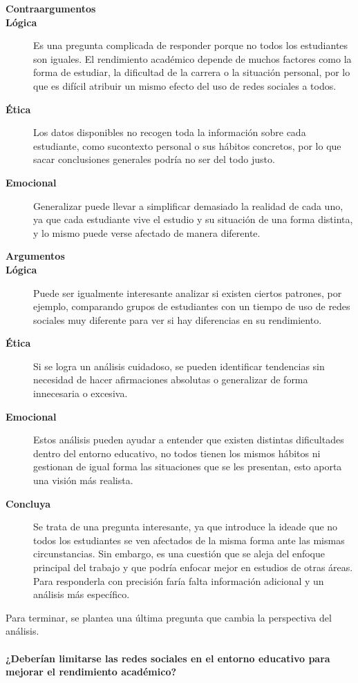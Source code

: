 \documentclass[12pt]{article}
\begin{document}
\begin{description}

\item[\textbf{Contraargumentos}]
\item[\textbf{Lógica}] Es una pregunta complicada de responder porque no todos los estudiantes son iguales. El rendimiento académico depende de muchos factores como la forma de estudiar, la dificultad de la carrera o la situación personal, por lo que es difícil atribuir un mismo efecto del uso de redes sociales a todos.
\item[\textbf{Ética}] Los datos disponibles no recogen toda la información sobre cada estudiante, como sucontexto personal o sus hábitos concretos, por lo que sacar conclusiones generales podría no ser del todo justo.
\item[\textbf{Emocional}] Generalizar puede llevar a simplificar demasiado la realidad de cada uno, ya que cada estudiante vive el estudio y su situación de una forma distinta, y lo mismo puede verse afectado de manera diferente.

\item[\textbf{Argumentos}]
\item[\textbf{Lógica}] Puede ser igualmente interesante analizar si existen ciertos patrones, por ejemplo, comparando grupos de estudiantes con un tiempo de uso de redes sociales muy diferente para ver si hay diferencias en su rendimiento.
\item[\textbf{Ética}] Si se logra un análisis cuidadoso, se pueden identificar tendencias sin necesidad de hacer afirmaciones absolutas o generalizar de forma innecesaria o excesiva.
\item[\textbf{Emocional}] Estos análisis pueden ayudar a entender que existen distintas dificultades dentro del entorno educativo, no todos tienen los mismos hábitos ni gestionan de igual forma las situaciones que se les presentan, esto aporta una visión más realista.
\item[\textbf{Concluya}] Se trata de una pregunta interesante, ya que introduce la ideade que no todos los estudiantes se ven afectados de la misma forma ante las mismas circunstancias. Sin embargo, es una cuestión que se aleja del enfoque principal del trabajo y que podría enfocar mejor en estudios de otras áreas. Para responderla con precisión faría falta información adicional y un análisis más específico.

\end{description}

Para terminar, se plantea una última pregunta que cambia la perspectiva del análisis.
\\
\\
\textbf{¿Deberían limitarse las redes sociales en el entorno educativo para mejorar el                      rendimiento académico?}
\end{document}
